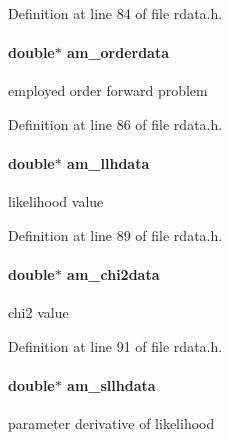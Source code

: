 Definition at line 84 of file rdata.\+h.

\hypertarget{struct_return_data_af792e4a1c5c23c5232ef9398e25de1a7}{}
\paragraph[{am\+\_\+orderdata}]{\setlength{\rightskip}{0pt plus 5cm}double$\ast$ am\+\_\+orderdata}\label{struct_return_data_af792e4a1c5c23c5232ef9398e25de1a7}
employed order forward problem 

Definition at line 86 of file rdata.\+h.

\hypertarget{struct_return_data_af95fa143e0e524652f9a818f6288b544}{}
\paragraph[{am\+\_\+llhdata}]{\setlength{\rightskip}{0pt plus 5cm}double$\ast$ am\+\_\+llhdata}\label{struct_return_data_af95fa143e0e524652f9a818f6288b544}
likelihood value 

Definition at line 89 of file rdata.\+h.

\hypertarget{struct_return_data_ae0fc05ce8c52bdda5c7bff541c79945d}{}
\paragraph[{am\+\_\+chi2data}]{\setlength{\rightskip}{0pt plus 5cm}double$\ast$ am\+\_\+chi2data}\label{struct_return_data_ae0fc05ce8c52bdda5c7bff541c79945d}
chi2 value 

Definition at line 91 of file rdata.\+h.

\hypertarget{struct_return_data_a45bc00583c09b05b35fa1a1874225aff}{}
\paragraph[{am\+\_\+sllhdata}]{\setlength{\rightskip}{0pt plus 5cm}double$\ast$ am\+\_\+sllhdata}\label{struct_return_data_a45bc00583c09b05b35fa1a1874225aff}
parameter derivative of likelihood 

